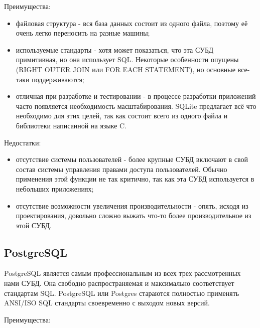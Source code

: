 \hspace{0.6cm} Преимущества:

\begin{itemize}
  \item файловая структура - вся база данных состоит из одного файла, поэтому её очень легко переносить на разные машины;
  \item используемые стандарты - хотя может показаться, что эта СУБД примитивная, но она использует SQL. Некоторые особенности опущены (RIGHT OUTER JOIN или FOR EACH STATEMENT), но основные все-таки поддерживаются;
  \item отличная при разработке и тестировании - в процессе разработки приложений часто появляется необходимость масштабирования. SQLite предлагает всё что необходимо для этих целей, так как состоит всего из одного файла и библиотеки написанной на языке C.
\end{itemize}

\hspace{0.6cm} Недостатки:

\begin{itemize}
  \item отсутствие системы пользователей - более крупные СУБД включают в свой состав системы управления правами доступа пользователей. Обычно применения этой функции не так критично, так как эта СУБД используется в небольших приложениях;
  \item отсутствие возможности увеличения производительности - опять, исходя из проектирования, довольно сложно выжать что-то более производительное из этой СУБД.
\end{itemize}

\subsection{PostgreSQL}

\hspace{0.6cm} PostgreSQL является самым профессиональным из всех трех рассмотренных нами СУБД. Она свободно распространяемая и максимально соответствует стандартам SQL. PostgreSQL или Postgres стараются полностью применять ANSI/ISO SQL стандарты своевременно с выходом новых версий\cite{web:PostgreSQL}.

\hspace{0.6cm} Преимущества:

